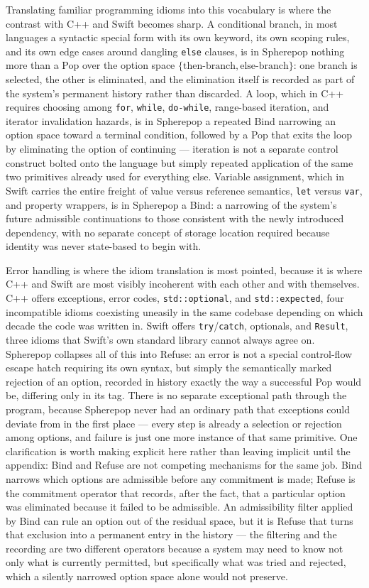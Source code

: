 \documentclass[11pt]{article}
\begin{document}
Translating familiar programming idioms into this vocabulary is where the contrast with C++ and Swift becomes sharp. A conditional branch, in most languages a syntactic special form with its own keyword, its own scoping rules, and its own edge cases around dangling \texttt{else} clauses, is in Spherepop nothing more than a Pop over the option space $\{\text{then-branch}, \text{else-branch}\}$: one branch is selected, the other is eliminated, and the elimination itself is recorded as part of the system's permanent history rather than discarded. A loop, which in C++ requires choosing among \texttt{for}, \texttt{while}, \texttt{do-while}, range-based iteration, and iterator invalidation hazards, is in Spherepop a repeated Bind narrowing an option space toward a terminal condition, followed by a Pop that exits the loop by eliminating the option of continuing --- iteration is not a separate control construct bolted onto the language but simply repeated application of the same two primitives already used for everything else. Variable assignment, which in Swift carries the entire freight of value versus reference semantics, \texttt{let} versus \texttt{var}, and property wrappers, is in Spherepop a Bind: a narrowing of the system's future admissible continuations to those consistent with the newly introduced dependency, with no separate concept of storage location required because identity was never state-based to begin with.

Error handling is where the idiom translation is most pointed, because it is where C++ and Swift are most visibly incoherent with each other and with themselves. C++ offers exceptions, error codes, \texttt{std::optional}, and \texttt{std::expected}, four incompatible idioms coexisting uneasily in the same codebase depending on which decade the code was written in. Swift offers \texttt{try}/\texttt{catch}, optionals, and \texttt{Result}, three idioms that Swift's own standard library cannot always agree on. Spherepop collapses all of this into Refuse: an error is not a special control-flow escape hatch requiring its own syntax, but simply the semantically marked rejection of an option, recorded in history exactly the way a successful Pop would be, differing only in its tag. There is no separate exceptional path through the program, because Spherepop never had an ordinary path that exceptions could deviate from in the first place --- every step is already a selection or rejection among options, and failure is just one more instance of that same primitive. One clarification is worth making explicit here rather than leaving implicit until the appendix: Bind and Refuse are not competing mechanisms for the same job. Bind narrows which options are admissible before any commitment is made; Refuse is the commitment operator that records, after the fact, that a particular option was eliminated because it failed to be admissible. An admissibility filter applied by Bind can rule an option out of the residual space, but it is Refuse that turns that exclusion into a permanent entry in the history --- the filtering and the recording are two different operators because a system may need to know not only what is currently permitted, but specifically what was tried and rejected, which a silently narrowed option space alone would not preserve.
\end{document}
